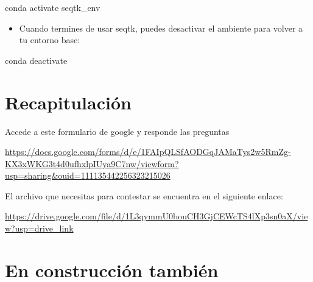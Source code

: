 \documentclass[
]{book}
\newenvironment{Shaded}{\begin{snugshade}}{\end{snugshade}}
\newcommand{\ExtensionTok}[1]{#1}
\newcommand{\NormalTok}[1]{#1}
\providecommand{\tightlist}{%
  \setlength{\itemsep}{0pt}\setlength{\parskip}{0pt}}
\begin{document}
\begin{Shaded}
\begin{Highlighting}[]
\ExtensionTok{conda}\NormalTok{ activate seqtk\_env}
\end{Highlighting}
\end{Shaded}

\begin{itemize}
\tightlist
\item
  Cuando termines de usar seqtk, puedes desactivar el ambiente para volver a tu entorno base:
\end{itemize}

\begin{Shaded}
\begin{Highlighting}[]
\ExtensionTok{conda}\NormalTok{ deactivate}
\end{Highlighting}
\end{Shaded}

\chapter{Recapitulación}\label{recapitulaciuxf3n}

Accede a este formulario de google y responde las preguntas

\url{https://docs.google.com/forms/d/e/1FAIpQLSfAODGqJAMaTys2w5RmZg-KX3xWKG3t4d0ufhxlpIUya9C7nw/viewform?usp=sharing&ouid=111135442256323215026}

El archivo que necesitas para contestar se encuentra en el siguiente enlace:

\url{https://drive.google.com/file/d/1L3qymmU0bouCH3GjCEWcTS4lXp3sn0aX/view?usp=drive_link}

\chapter{En construcción también}\label{en-construcciuxf3n-tambiuxe9n}
\end{document}
